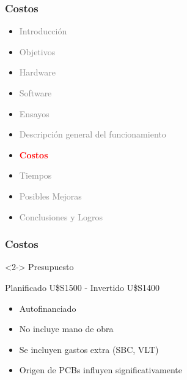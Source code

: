 \documentclass{beamer}
\begin{document}
\begin{frame}
	\frametitle{Costos}
	\begin{itemize}
		\item \textcolor{gray}{Introducción}
		\item \textcolor{gray}{Objetivos}
		\item \textcolor{gray}{Hardware}
		\item \textcolor{gray}{Software}
		\item \textcolor{gray}{Ensayos}
		\item \textcolor{gray}{Descripción general del funcionamiento}
		\item \textcolor{red}{\bf{Costos}}
		\item \textcolor{gray}{Tiempos}		
		\item \textcolor{gray}{Posibles Mejoras}
		\item \textcolor{gray}{Conclusiones y Logros}
	\end{itemize}
\end{frame}

\begin{frame}
	\frametitle{Costos}
	\begin{block} <2-> {Presupuesto}
		\begin{center}
			Planificado U\$S1500 - Invertido U\$S1400
		\end{center}
	\end{block}

	\bigskip
	\begin{itemize}
		\item <3-> Autofinanciado

		\bigskip
		\item <4-> No incluye mano de obra

		\bigskip
		\item <5-> Se incluyen gastos extra (SBC, VLT)

		\bigskip
		\item <6-> Origen de PCBs influyen significativamente
	\end{itemize}
\end{frame}	
\end{document}
